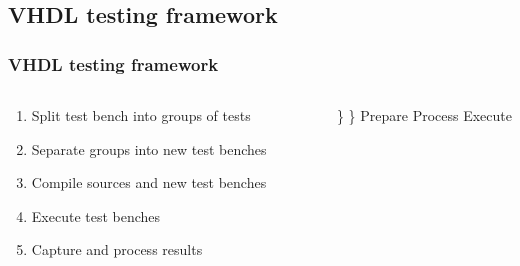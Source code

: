 \documentclass[british,10pt]{beamer}
\begin{document}
%


\subsection{VHDL testing framework}

\begin{frame}\frametitle{VHDL testing framework}
\begin{columns}
\begin{column}{0.60\textwidth}
\begin{enumerate}
\item Split test bench into groups of tests
\item Separate groups into new test benches
\item Compile sources and new test benches
\item Execute test benches
\item Capture and process results
\end{enumerate}
\end{column}
\vskip12pt
\Huge\}
\vskip1pt
\}
 Prepare
\vskip13pt
 Process
\vskip17pt
 Execute
\end{columns}
\end{frame}
\end{document}
